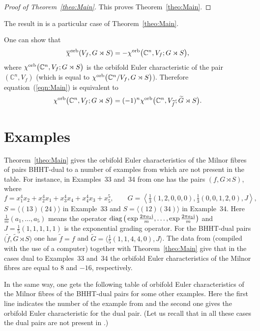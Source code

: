 \documentclass[pdftex]{sigma}
\numberwithin{equation}{section}
\begin{document}
\begin{proof}[Proof of Theorem~\ref{theo:Main}]
This proves Theorem~\ref{theo:Main}.
\end{proof}

\begin{Remark}The result in \cite[Theorem~4]{EG-1811} is a particular case of Theorem~\ref{theo:Main}.
\end{Remark}

\begin{Remark} One can show that
 \[
 {\overline{\chi}}^{ \rm orb}(V_f,G \rtimes S)=-{\chi}^{\rm orb}\big({\mathbb C}^n,V_f;G \rtimes S\big),
 \]
 where ${\chi}^{\rm orb}\big({\mathbb C}^n,V_f;G \rtimes S\big)$ is the orbifold Euler characteristic of the pair $({\mathbb C}^n,V_f)$
 (which is equal to ${\chi}^{\rm orb}\big({\mathbb C}^n/V_f,G \rtimes S\big)$). Therefore equation~(\ref{eqn:Main}) is equivalent to
 \[
 {\chi}^{\rm orb}\big({\mathbb C}^n,V_f;G \rtimes S\big)=(-1)^n{\chi}^{\rm orb}\big({\mathbb C}^n,V_{\widetilde{f}};\widetilde{G} \rtimes S\big).
 \]
\end{Remark}

\section{Examples} \label{sect:Examples}

Theorem~\ref{theo:Main} gives the orbifold Euler characteristics of the Milnor fibres of pairs BHHT-dual to
a number of examples from \cite[Table~2]{Mukai} which are not present in the table. For instance, in Examples~33 and~34 from \cite{Mukai} one has the pairs $(f,G \rtimes S)$, where
\[
f=x_1^4x_2+x_2^4x_1+x_3^4x_4+x_4^4x_3+x_5^5, \qquad G=\left\langle\tfrac{1}{3}(1,2,0,0,0), \tfrac{1}{3}(0,0,1,2,0), J\right\rangle,
\]
$S=\langle(13)(24)\rangle$ in Example~33 and $S=\langle(12)(34)\rangle$ in Example~34. Here $\frac{1}{m}(a_1,\dots, a_5)$ means the operator $\operatorname{diag} \big(\exp\frac{2\pi a_1 {\rm i}}{m},\dots,\exp\frac{2\pi a_5{\rm i}}{m}\big)$ and $J=\frac{1}{5}(1,1,1,1,1)$ is the exponential grading operator. For the BHHT-dual pairs $\big(\widetilde{f}, \widetilde{G} \rtimes S\big)$ one has $\widetilde{f}=f$ and $\widetilde{G}=\big\langle\frac{1}{5}(1,1,4,4,0), J\big\rangle$. The data from \cite[Table~2]{Mukai} (compiled with the use of a computer) together with Theorem~\ref{theo:Main} give that in the cases dual to Examples~33 and~34 the orbifold Euler characteristics of the Milnor fibres are equal to $8$ and $-16$, respectively.

In the same way, one gets the following table of orbifold Euler characteristics of the Milnor fibres of the
BHHT-dual pairs for some other examples. Here the first line indicates the number of the example from
\cite[Table~2]{Mukai} and the second one gives the orbifold Euler characteristic for the dual pair.
(Let us recall that in all these cases the dual pairs are not present in \cite[Table~2]{Mukai}.)
\end{document}
